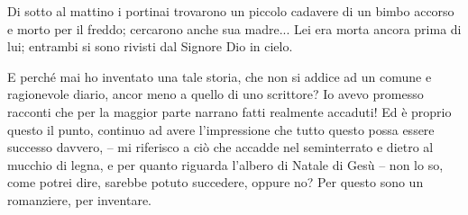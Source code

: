 \documentclass[a4paper, 12pt]{article}
\begin{document}
\begin{linenumbers}
	Di sotto al mattino i portinai trovarono un piccolo cadavere di un bimbo accorso e morto per il freddo; cercarono anche sua madre...
	Lei era morta ancora prima di lui;
	entrambi si sono rivisti dal Signore Dio in cielo.
	
	\vspace{1.5em}
	
	E perché mai ho inventato una tale storia, che non si addice ad un comune e ragionevole diario, ancor meno a quello di uno scrittore?
	Io avevo promesso racconti che per la maggior parte narrano fatti realmente accaduti!
	Ed è proprio questo il punto, continuo ad avere l'impressione che tutto questo possa essere successo davvero, -- mi riferisco a ciò che accadde nel seminterrato e dietro al mucchio di legna, e per quanto riguarda l'albero di Natale di Gesù -- non lo so, come potrei dire, sarebbe potuto succedere, oppure no?
	Per questo sono un romanziere, per inventare.
	
\end{linenumbers}
\end{document}
